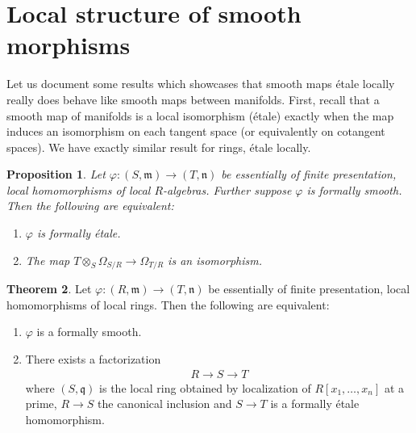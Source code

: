 \documentclass[letterpaper,10pt,twoside]{amsart}
\newcommand{\ideal}[1]{\mathfrak{#1}}
\newcommand{\tens}{\otimes}
\theoremstyle{proposition}
\newtheorem{proposition}{Proposition}[section]
\theoremstyle{definition}
\theoremstyle{theorem}
\newtheorem{theorem}[proposition]{Theorem}
\theoremstyle{definition}
\theoremstyle{definition}
\theoremstyle{definition}
\theoremstyle{lemma}
\theoremstyle{definition}
\theoremstyle{definition}
\theoremstyle{corollary}
\theoremstyle{definition}
\begin{document}
	\section{Local structure of smooth morphisms}
	Let us document some results which showcases that smooth maps \'etale locally really does behave like smooth maps between manifolds. First, recall that a smooth map of manifolds is a local isomorphism (\'etale) exactly when the map induces an isomorphism on each tangent space (or equivalently on cotangent spaces). We have exactly similar result for rings, \'etale locally.
	\begin{proposition}\label{P-Etale maps induce isomorphisms on cotangent spaces}
		Let $\varphi : (S,\ideal{m}) \to (T,\ideal{n})$ be essentially of finite presentation, local homomorphisms of local $R$-algebras. Further suppose $\varphi$ is formally smooth. Then the following are equivalent:
		\begin{enumerate}
			\item {$\varphi$ is formally \'etale.}
			\item {The map $T\tens_{S}\Omega_{S/R} \to \Omega_{T/R}$ is an isomorphism.}
		\end{enumerate}
	\end{proposition}
	\begin{theorem}
		Let $\varphi : (R,\ideal{m}) \to (T,\ideal{n})$ be essentially of finite presentation, local homomorphisms of local rings. Then the following are equivalent:
		\begin{enumerate}
			\item {$\varphi$ is a formally smooth.}
			\item {There exists a factorization 
			\begin{align*}
				R\to S\to T
				\end{align*}
			where $(S,\ideal{q})$ is the local ring obtained by localization of $R[x_1,\dots,x_n]$ at a prime, $R\to S$ the canonical inclusion and $S\to T$ is a formally \'etale homomorphism.
			}
		\end{enumerate} 
	\end{theorem}
\end{document}
